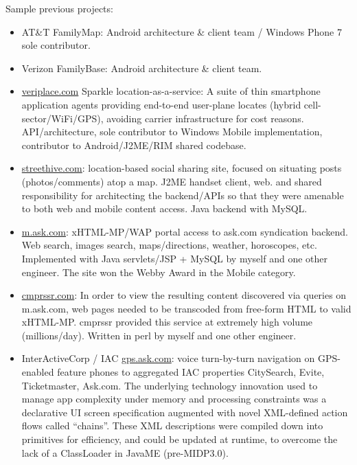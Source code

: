 \bigskip
Sample previous projects:

	   \begin{itemize}
		\item AT\&T FamilyMap: Android architecture \& client team / Windows Phone 7 sole contributor.  \\[-16pt]
		\item Verizon FamilyBase: Android architecture \& client team.  \\[-16pt]

		\item \url{veriplace.com} Sparkle location-as-a-service: A suite of thin smartphone application agents providing
		end-to-end user-plane locates (hybrid cell-sector/WiFi/GPS), avoiding carrier infrastructure for cost reasons.
		API/architecture, sole contributor to Windows Mobile implementation, contributor to Android/J2ME/RIM
		shared codebase.

		\item \url{streethive.com}: location-based social sharing site, focused on situating posts (photos/comments) atop a map. J2ME handset client, web.  and shared responsibility for architecting the backend/APIs so that they were amenable to both web and mobile content access. Java backend with MySQL.

		\item \url{m.ask.com}: xHTML-MP/WAP portal access to ask.com syndication backend. Web search, images search, maps/directions, weather, horoscopes, etc. Implemented with Java servlets/JSP + MySQL by myself and one other engineer.  The site won the Webby Award in the Mobile category.

		\item \url{cmprssr.com}: In order to view the resulting content discovered via queries on m.ask.com, web pages needed to be transcoded from free-form HTML to valid xHTML-MP. cmprssr provided this service at extremely high volume (millions/day). Written in perl by myself and one other engineer.

  		\item InterActiveCorp / IAC \url{gps.ask.com}: voice turn-by-turn navigation on GPS-enabled feature phones to aggregated IAC properties CitySearch, Evite, Ticketmaster, Ask.com. The underlying technology innovation used to manage app complexity under memory and processing constraints was a declarative UI screen specification augmented with novel XML-defined action flows called “chains”. These XML descriptions were compiled down into primitives for efficiency, and could be updated at runtime, to overcome the lack of a ClassLoader in JavaME (pre-MIDP3.0). 
	   

\end{itemize}
